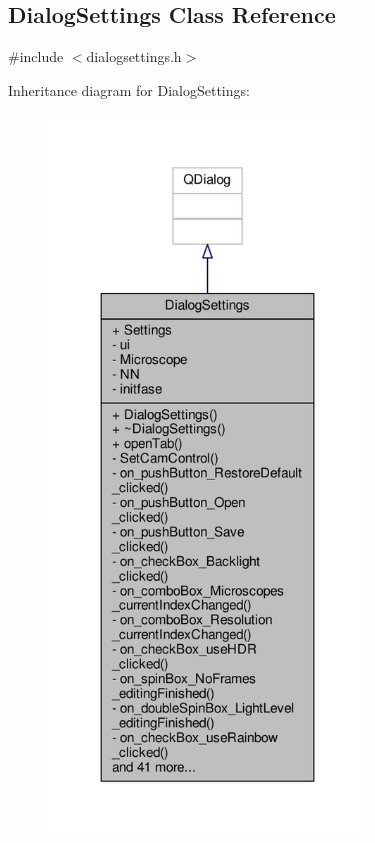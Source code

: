 \hypertarget{class_dialog_settings}{}\subsection{Dialog\+Settings Class Reference}
\label{class_dialog_settings}


{\ttfamily \#include $<$dialogsettings.\+h$>$}



Inheritance diagram for Dialog\+Settings\+:
\nopagebreak
\begin{figure}[H]
\begin{center}
\leavevmode
\includegraphics[width=239pt]{class_dialog_settings__inherit__graph}
\end{center}
\end{figure}



